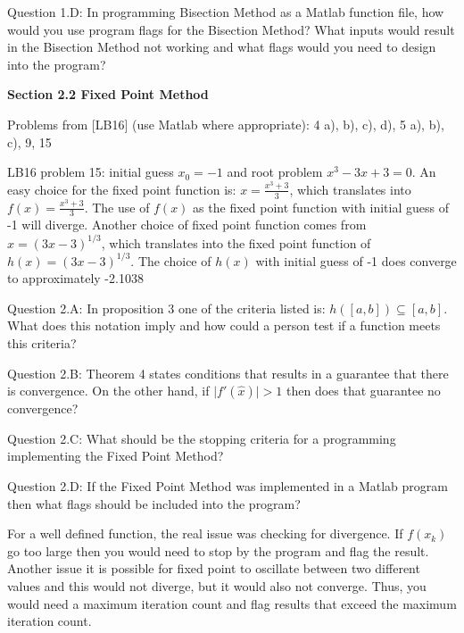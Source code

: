 \documentclass{article}
\renewcommand{\cite}[1]{[#1]}
\def\ds{\displaystyle}
\begin{document}
\medskip \par \noindent
%
Question 1.D: In programming Bisection Method as a Matlab function file, how would you use program flags for the Bisection Method? What inputs would result in the Bisection Method not working and what flags would you need to design into the program?
\medskip \par \noindent
%
\par \bigskip \par
{\bf Section 2.2 Fixed Point Method} \\
\medskip \par \noindent
Problems from \cite{LB16} (use Matlab where appropriate): 4 a), b), c), d), 5 a), b), c), 9, 15
\par
{\color{teal}LB16 problem 15: initial guess $\ds x_0=-1$ and root problem $\ds x^3-3x+3=0$. An easy choice for the fixed point function is: $\ds x = \frac {x^3+3}3$, which translates into $\ds f(x) =   \frac {x^3+3}3$.  The use of $f(x)$ as the fixed point function with initial guess of -1 will diverge. Another choice of fixed point function comes from $\ds x = (3x-3)^{1/3}$, which translates into the fixed point function of $\ds h(x) = (3x-3)^{1/3}$. The choice of $h(x)$ with initial guess of -1 does converge to approximately -2.1038}
\par \medskip \noindent
%
Question 2.A: In proposition 3 one of the criteria listed is: $\ds h([a,b]) \subseteq [a,b]$. What does this notation imply and how could a person test if a function meets this criteria?

 \medskip \par \noindent
%
Question 2.B: Theorem 4 states conditions that results in a guarantee that there is convergence. On the other hand, if $\ds \vert f ' (\hat x) \vert > 1$ then does that guarantee no convergence?  
 \medskip \par \noindent
%
Question 2.C: What should be the stopping criteria for a programming implementing the Fixed Point Method?
\medskip \par \noindent
%
Question 2.D: If the Fixed Point Method was implemented in a Matlab program then what flags should be included into the program? 

{\color{teal} For a well defined function, the real issue was checking for divergence. If $f(x_k)$ go too large then you would need to stop by the program and flag the result. Another issue it is possible for fixed point to oscillate between two different values and this would not diverge, but it would also not converge. Thus, you would need a maximum iteration count and flag results that exceed the maximum iteration count. }
\end{document}
